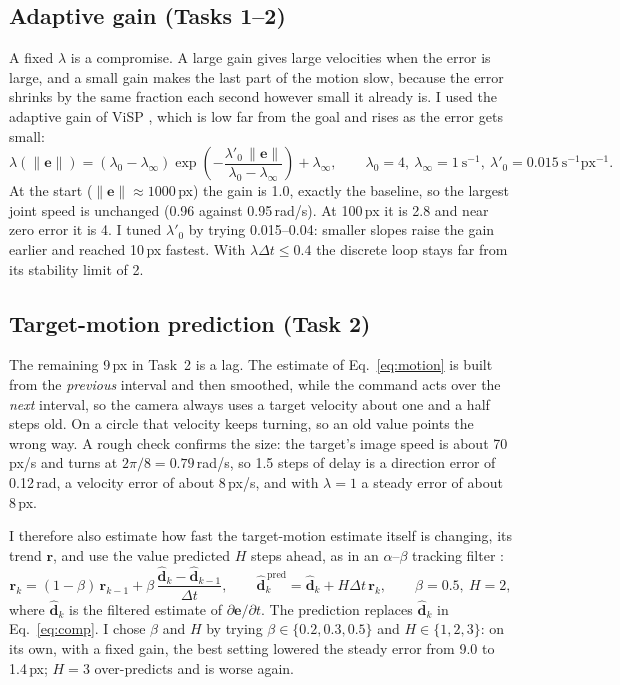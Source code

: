 \documentclass[11pt,a4paper]{article}
\newcommand{\vect}[1]{\bm{#1}}
\begin{document}
\subsection{Adaptive gain (Tasks 1--2)}

A fixed $\lambda$ is a compromise. A large gain gives large velocities when the error is large, and a
small gain makes the last part of the motion slow, because the error shrinks by the same fraction each
second however small it already is. I used the adaptive gain of ViSP \cite{visp2005}, which is low
far from the goal and rises as the error gets small:
\begin{equation}
  \lambda(\lVert\vect e\rVert)=(\lambda_0-\lambda_\infty)\exp\!\left(-\frac{\lambda'_0\,\lVert\vect e\rVert}{\lambda_0-\lambda_\infty}\right)+\lambda_\infty,
  \qquad \lambda_0=4,\ \lambda_\infty=1\ \text{s}^{-1},\ \lambda'_0=0.015\ \text{s}^{-1}\text{px}^{-1}.
\end{equation}
At the start ($\lVert\vect e\rVert\approx1000$\,px) the gain is 1.0, exactly the baseline, so the largest
joint speed is unchanged (0.96 against 0.95\,rad/s). At 100\,px it is 2.8 and near zero error it is 4.
I tuned $\lambda'_0$ by trying 0.015--0.04: smaller slopes raise the gain earlier and reached 10\,px
fastest. With $\lambda\Delta t\le0.4$ the discrete loop stays far from its stability limit of 2.

\subsection{Target-motion prediction (Task 2)}

The remaining 9\,px in Task~2 is a lag. The estimate of Eq.~\eqref{eq:motion} is built from the
\emph{previous} interval and then smoothed, while the command acts over the \emph{next} interval, so the
camera always uses a target velocity about one and a half steps old. On a circle that velocity keeps
turning, so an old value points the wrong way. A rough check confirms the size: the target's image
speed is about 70\,px/s and turns at $2\pi/8=0.79$\,rad/s, so 1.5 steps of delay is a direction error of
0.12\,rad, a velocity error of about 8\,px/s, and with $\lambda=1$ a steady error of about 8\,px.

I therefore also estimate how fast the target-motion estimate itself is changing, its trend
$\vect r$, and use the value predicted $H$ steps ahead, as in an $\alpha$--$\beta$ tracking filter
\cite{barshalom2001}:
\begin{equation}
  \vect r_k=(1-\beta)\,\vect r_{k-1}+\beta\,\frac{\hat{\vect d}_k-\hat{\vect d}_{k-1}}{\Delta t},\qquad
  \hat{\vect d}^{\,\text{pred}}_k=\hat{\vect d}_k+H\Delta t\,\vect r_k,\qquad \beta=0.5,\ H=2,
\end{equation}
where $\hat{\vect d}_k$ is the filtered estimate of $\partial\vect e/\partial t$. The prediction
replaces $\hat{\vect d}_k$ in Eq.~\eqref{eq:comp}. I chose $\beta$ and $H$ by trying $\beta\in\{0.2,0.3,0.5\}$
and $H\in\{1,2,3\}$: on its own, with a fixed gain, the best setting lowered the steady error from 9.0
to 1.4\,px; $H=3$ over-predicts and is worse again.
\end{document}
